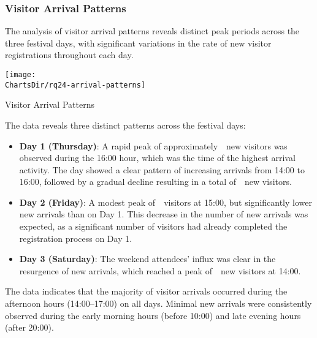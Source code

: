 
\subsubsection{Visitor Arrival Patterns}
\label{subsubsec:analysis-visitor-patterns}


The analysis of visitor arrival patterns reveals distinct peak periods across the three festival days, with significant variations in the rate of new visitor registrations throughout each day.

\begin{chart}[H]
	\centering
	\texttt{[image: \\ChartsDir/rq24-arrival-patterns]}
	\caption{ Visitor Arrival Patterns}
	\label{chart:visitor-arrival-patterns}
	\source
\end{chart}

The data reveals three distinct patterns across the festival days:

\begin{itemize}
	\item \textbf{Day 1 (Thursday)}: A rapid peak of approximately~~new visitors was observed during the 16:00 hour, which was the time of the highest arrival activity.
	The day showed a clear pattern of increasing arrivals from 14:00 to 16:00, followed by a gradual decline resulting in a total of~~new visitors.
	\item \textbf{Day 2 (Friday)}: A modest peak of~~visitors at 15:00, but significantly lower new arrivals than on Day 1.
	This decrease in the number of new arrivals was expected, as a significant number of visitors had already completed the registration process on Day 1.
	\item \textbf{Day 3 (Saturday)}: The weekend attendees' influx was clear in the resurgence of new arrivals, which reached a peak of~~new visitors at 14:00.
\end{itemize}

The data indicates that the majority of visitor arrivals occurred during the afternoon hours (14:00–17:00) on all days.
Minimal new arrivals were consistently observed during the early morning hours (before 10:00) and late evening hours (after 20:00).

